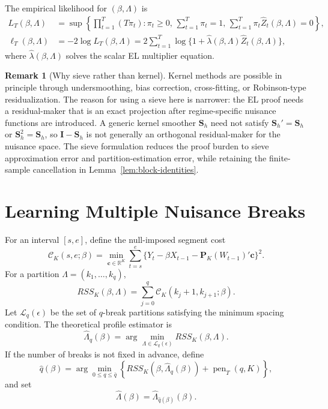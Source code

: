 \documentclass[12pt]{article} %
\numberwithin{equation}{section}
\theoremstyle{definition}
\newtheorem{remark}{Remark}
\newcommand{\R}{\mathbb R}
\begin{document}
The empirical likelihood for \((\beta,\Lambda)\) is
\begin{align}
    L_T(\beta,\Lambda)
    &=
    \sup
    \left\{
    \prod_{t=1}^T(T\pi_t):
    \pi_t\geq0,\,
    \sum_{t=1}^T\pi_t=1,\,
    \sum_{t=1}^T\pi_t\widehat Z_t(\beta,\Lambda)=0
    \right\},
    \label{eq:block-el}\\
    \ell_T(\beta,\Lambda)
    &=
    -2\log L_T(\beta,\Lambda)
    =
    2\sum_{t=1}^T
    \log\{1+\widehat\lambda(\beta,\Lambda)\widehat Z_t(\beta,\Lambda)\},
    \label{eq:block-elr}
\end{align}
where \(\widehat\lambda(\beta,\Lambda)\) solves the scalar EL multiplier equation.

\begin{remark}[Why sieve rather than kernel]
Kernel methods are possible in principle through undersmoothing, bias correction, cross-fitting, or Robinson-type residualization. The reason for using a sieve here is narrower: the EL proof needs a residual-maker that is an exact projection after regime-specific nuisance functions are introduced. A generic kernel smoother \(\bm S_h\) need not satisfy \(\bm S_h'=\bm S_h\) or \(\bm S_h^2=\bm S_h\), so \(\bm I-\bm S_h\) is not generally an orthogonal residual-maker for the nuisance space. The sieve formulation reduces the proof burden to sieve approximation error and partition-estimation error, while retaining the finite-sample cancellation in Lemma~\ref{lem:block-identities}.
\end{remark}

\section{Learning Multiple Nuisance Breaks}
\label{sec:learning}

For an interval \([s,e]\), define the null-imposed segment cost
\begin{equation}
    \mathcal C_K(s,e;\beta)
    =
    \min_{\bm c\in\R^K}
    \sum_{t=s}^e
    \{Y_t-\beta X_{t-1}-\bm P_K(W_{t-1})'\bm c\}^2.
    \label{eq:segment-cost}
\end{equation}
For a partition \(\Lambda=(k_1,\ldots,k_q)\),
\begin{equation}
    RSS_K(\beta,\Lambda)
    =
    \sum_{j=0}^{q}
    \mathcal C_K(k_j+1,k_{j+1};\beta).
    \label{eq:rss}
\end{equation}
Let \(\mathcal L_q(\epsilon)\) be the set of \(q\)-break partitions satisfying the minimum spacing condition. The theoretical profile estimator is
\begin{equation}
    \widehat\Lambda_q(\beta)
    =
    \arg\min_{\Lambda\in\mathcal L_q(\epsilon)}
    RSS_K(\beta,\Lambda).
    \label{eq:lambda-hat-q}
\end{equation}
If the number of breaks is not fixed in advance, define
\begin{equation}
    \widehat q(\beta)
    =
    \arg\min_{0\leq q\leq\bar q}
    \left\{
    RSS_K(\beta,\widehat\Lambda_q(\beta))
    +
    \operatorname{pen}_T(q,K)
    \right\},
    \label{eq:qhat}
\end{equation}
and set
\[
    \widehat\Lambda(\beta)=
    \widehat\Lambda_{\widehat q(\beta)}(\beta).
\]
\end{document}
